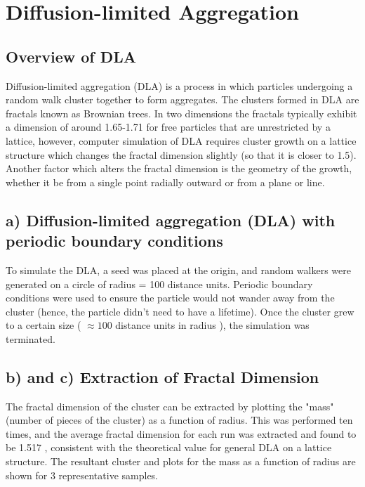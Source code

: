\documentclass[a4paper]{article}
\begin{document}
\section{Diffusion-limited Aggregation}

\subsection*{Overview of DLA}
Diffusion-limited aggregation (DLA) is a process in which particles undergoing a random walk cluster together to form aggregates.  The clusters formed in DLA are fractals known as Brownian trees.   In two dimensions the fractals typically exhibit a dimension of around 1.65-1.71 for free particles that are unrestricted by a lattice, however, computer simulation of DLA requires cluster growth on a lattice structure which changes the fractal dimension slightly (so that it is closer to 1.5).  Another factor which alters the fractal dimension is the geometry of the growth, whether it be from a single point radially outward or from a plane or line.

\subsection*{a) Diffusion-limited aggregation (DLA) with periodic boundary conditions}

To simulate the DLA, a seed was placed at the origin, and random walkers were generated on a circle of radius = 100 distance units. Periodic boundary conditions were used to ensure the particle would not wander away from the cluster (hence, the particle didn't need to have a lifetime). Once the cluster grew to a certain size ( \(\approx 100\) distance units in radius ), the simulation was terminated.



\subsection*{b) and c)  Extraction of Fractal Dimension }
The fractal dimension of the cluster can be extracted by plotting the "mass"  (number of  pieces of the cluster) as a function of radius. This was performed ten times, and the average fractal dimension for each run was extracted and found to be 1.517 , consistent with the theoretical value for general DLA on a  lattice structure.   The resultant cluster and plots for the mass as a function of radius are shown for 3 representative samples.  
\end{document}
